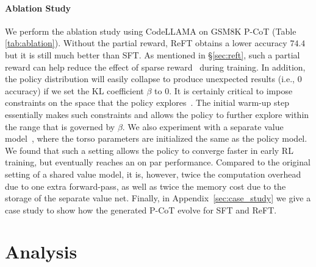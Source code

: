 \begin{table}[t!]
    \centering
    \caption{Ablation study on GSM8K P-CoT.}
    \label{tab:ablation}
\end{table}

\paragraph{Ablation Study}
We perform the ablation study using CodeLLAMA on GSM8K P-CoT (Table \ref{tab:ablation}). 
Without the partial reward, ReFT obtains a lower accuracy $74.4$ but it is still much better than SFT. 
As mentioned in \S\ref{sec:reft}, such a partial reward can help reduce the effect of sparse reward~\cite{trott2019keeping} during training.
In addition, the policy distribution will easily collapse to produce unexpected results (i.e., $0$ accuracy) if we set the KL coefficient $\beta$ to $0$. 
It is certainly critical to impose constraints on the space that the policy explores~\cite{ouyang2022training}. 
The initial warm-up step essentially makes such constraints and allows the policy to further explore within the range that is governed by $\beta$. 
We also experiment with a separate value model~\cite{andrychowicz2021matters,cobbe2021phasic}, 
where the torso parameters are initialized the same as the policy model.
We found that such a setting allows the policy to converge faster in early RL training, but eventually reaches an on par performance.
Compared to the original setting of a shared value model, 
it is, however, twice the computation overhead due to one extra forward-pass, 
as well as twice the memory cost due to the storage of the separate value net.
Finally, in Appendix~\ref{sec:case_study} we give a case study to show how the generated P-CoT evolve for SFT and ReFT.

\section{Analysis}
\label{sec:analysis}

